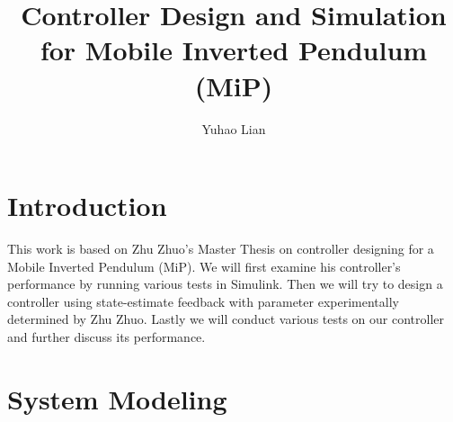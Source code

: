 \documentclass{article}
\title{Controller Design and Simulation for Mobile Inverted Pendulum (MiP)}
\author{Yuhao Lian}
\begin{document}
\maketitle
\section{Introduction}
This work is based on Zhu Zhuo's Master Thesis on controller designing for a Mobile Inverted Pendulum (MiP). We will first examine his controller's performance by running various tests in Simulink. Then we will try to design a controller using state-estimate feedback with parameter experimentally determined by Zhu Zhuo. Lastly we will conduct various tests on our controller and further discuss its performance.
\\
\section{System Modeling}
\end{document}
